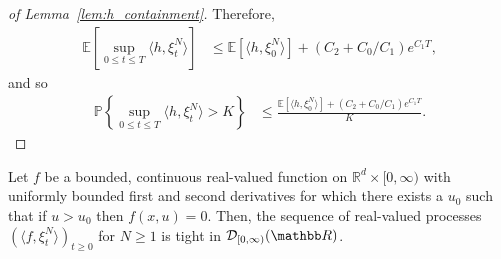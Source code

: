 \documentclass[EJP]{ejpecp} %
\newcommand{\IP}{\mathbb P}
\newcommand{\IE}{\mathbb E}
\newcommand{\IR}{\mathbb R}
\newcommand{\lp}{\xi}              %
\begin{document}
\begin{proof}[of Lemma~\ref{lem:h_containment}]
    Therefore, 
    \begin{align*}
        \IE\left[ \sup_{0 \le t \le T} \langle h, \lp_t^N \rangle \right]
        &\le
        \IE\left[ \langle h, \lp_0^N \rangle \right]
        + (C_2 + C_0 / C_1) e^{C_1 T},
    \end{align*}
    and so
    \begin{align*}
        \IP\left\{ \sup_{0 \le t \le T} \langle h, \lp_t^N \rangle > K \right\}
        &\le
        \frac{
            \IE\left[ \langle h, \lp_0^N \rangle \right]
            + (C_2 + C_0 / C_1) e^{C_1 T}
        }{ K } .
    \end{align*}
\end{proof}

\begin{lemma}
    \label{lem:test_fn_tightness}
    Let $f$ be a bounded, continuous real-valued function on $\IR^d \times [0, \infty)$
    with uniformly bounded first and second derivatives
    for which there exists a $u_0$ such that if $u > u_0$ then $f(x, u) = 0$.
    Then, the sequence of real-valued processes $(\langle f, \lp_t^N \rangle)_{t \ge 0}$ for $N \ge 1$
    is tight in ${\cal D}_{[0,\infty)}(\IR)$.
\end{lemma}
\end{document}
